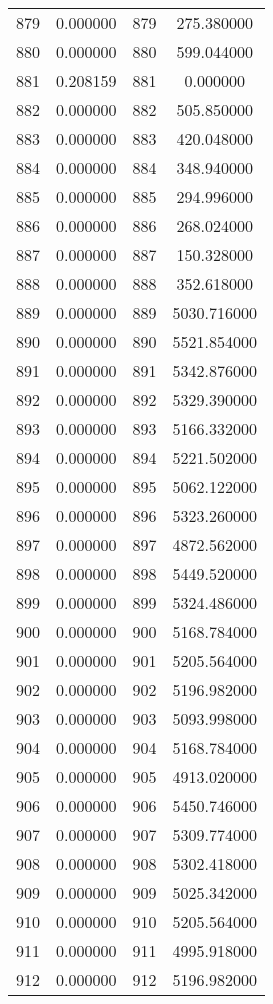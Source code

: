 \documentclass[12pt]{article}
\begin{document}
\begin{longtable}{@{}cccc@{}}
879 & 0.000000 & 879 & 275.380000 \\
880 & 0.000000 & 880 & 599.044000 \\
881 & 0.208159 & 881 & 0.000000 \\
882 & 0.000000 & 882 & 505.850000 \\
883 & 0.000000 & 883 & 420.048000 \\
884 & 0.000000 & 884 & 348.940000 \\
885 & 0.000000 & 885 & 294.996000 \\
886 & 0.000000 & 886 & 268.024000 \\
887 & 0.000000 & 887 & 150.328000 \\
888 & 0.000000 & 888 & 352.618000 \\
889 & 0.000000 & 889 & 5030.716000 \\
890 & 0.000000 & 890 & 5521.854000 \\
891 & 0.000000 & 891 & 5342.876000 \\
892 & 0.000000 & 892 & 5329.390000 \\
893 & 0.000000 & 893 & 5166.332000 \\
894 & 0.000000 & 894 & 5221.502000 \\
895 & 0.000000 & 895 & 5062.122000 \\
896 & 0.000000 & 896 & 5323.260000 \\
897 & 0.000000 & 897 & 4872.562000 \\
898 & 0.000000 & 898 & 5449.520000 \\
899 & 0.000000 & 899 & 5324.486000 \\
900 & 0.000000 & 900 & 5168.784000 \\
901 & 0.000000 & 901 & 5205.564000 \\
902 & 0.000000 & 902 & 5196.982000 \\
903 & 0.000000 & 903 & 5093.998000 \\
904 & 0.000000 & 904 & 5168.784000 \\
905 & 0.000000 & 905 & 4913.020000 \\
906 & 0.000000 & 906 & 5450.746000 \\
907 & 0.000000 & 907 & 5309.774000 \\
908 & 0.000000 & 908 & 5302.418000 \\
909 & 0.000000 & 909 & 5025.342000 \\
910 & 0.000000 & 910 & 5205.564000 \\
911 & 0.000000 & 911 & 4995.918000 \\
912 & 0.000000 & 912 & 5196.982000 \\

\end{longtable}
\end{document}
